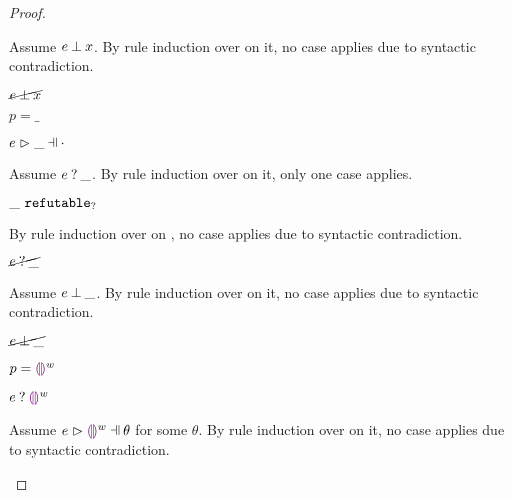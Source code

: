 \begin{proof}
\begin{byCases}
    Assume $e \mathbin{\bot} x$. By rule induction over  on it, no case applies due to syntactic contradiction.
    \begin{pfsteps*}
    \item $\cancel{e \mathbin{\bot} x}$ 
    \end{pfsteps*}
\item[\text{(\ref{rule:PTWild})}]
    \begin{pfsteps*}
    \item $p=\_$ 
    \item $\hpatmatch{e}{\_}{\cdot}$ 
    \end{pfsteps*}
    Assume $e \mathbin{?} \_$. By rule induction over  on it, only one case applies.
    \begin{byCases}
    \item[\text{(\ref{rule:MMNotIntro})}]
        \begin{pfsteps*}
        \item $\_ ~\mathtt{refutable}_?$  
        \end{pfsteps*}
        By rule induction over  on , no case applies due to syntactic contradiction.
    \end{byCases}
    \begin{pfsteps*}
    \item $\cancel{e \mathbin{?} \_}$ 
    \end{pfsteps*}
    Assume $e \mathbin{\bot} \_$. By rule induction over  on it, no case applies due to syntactic contradiction.
    \begin{pfsteps*}
    \item $\cancel{e \mathbin{\bot} \_}$ 
    \end{pfsteps*}
\item[\text{(\ref{rule:PTEHole})}]
    \begin{pfsteps*}
    \item $p=\textcolor{violet}{\llparenthesis}\textcolor{violet}{\rrparenthesis}^{w}$ 
    \item $e \mathbin{?} \textcolor{violet}{\llparenthesis}\textcolor{violet}{\rrparenthesis}^{w}$ 
    \end{pfsteps*}
    Assume $\hpatmatch{e}{\heholep{w}}{\theta}$ for some $\theta$. By rule induction over  on it, no case applies due to syntactic contradiction.
    \begin{pfsteps*}

\end{pfsteps*}
\end{byCases}
\end{proof}
